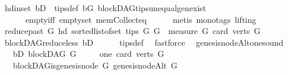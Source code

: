 \begin{isabellebody}
\ hd{\isacharunderscore}{\kern0pt}in{\isacharunderscore}{\kern0pt}set\ bD\ \ tips{\isacharunderscore}{\kern0pt}def\ bG\ blockDAG{\isachardot}{\kern0pt}tips{\isacharunderscore}{\kern0pt}unequal{\isacharunderscore}{\kern0pt}gen{\isacharunderscore}{\kern0pt}exist\ \isanewline
\ \ \ \ \ \ empty{\isacharunderscore}{\kern0pt}iff\ empty{\isacharunderscore}{\kern0pt}set\ mem{\isacharunderscore}{\kern0pt}Collect{\isacharunderscore}{\kern0pt}eq\isanewline
\ \ \ \ \isamarkupfalse%
\ {\isacharparenleft}{\kern0pt}metis\ {\isacharparenleft}{\kern0pt}mono{\isacharunderscore}{\kern0pt}tags{\isacharcomma}{\kern0pt}\ lifting{\isacharparenright}{\kern0pt}{\isacharparenright}{\kern0pt}\ \ \isanewline
\ \ \isamarkupfalse%
\ \isamarkupfalse%
\ {\isachardoublequoteopen}{\isacharparenleft}{\kern0pt}reduce{\isacharunderscore}{\kern0pt}past\ G\ {\isacharparenleft}{\kern0pt}hd\ {\isacharparenleft}{\kern0pt}sorted{\isacharunderscore}{\kern0pt}list{\isacharunderscore}{\kern0pt}of{\isacharunderscore}{\kern0pt}set\ {\isacharparenleft}{\kern0pt}tips\ G{\isacharparenright}{\kern0pt}{\isacharparenright}{\kern0pt}{\isacharparenright}{\kern0pt}{\isacharcomma}{\kern0pt}\ G{\isacharparenright}{\kern0pt}\ {\isasymin}\ measure\ {\isacharparenleft}{\kern0pt}{\isasymlambda}G{\isachardot}{\kern0pt}\ card\ {\isacharparenleft}{\kern0pt}verts\ G{\isacharparenright}{\kern0pt}{\isacharparenright}{\kern0pt}{\isachardoublequoteclose}\isanewline
\ \ \ \ \isamarkupfalse%
\ blockDAG{\isachardot}{\kern0pt}reduce{\isacharunderscore}{\kern0pt}less\ bD\isanewline
\ \ \ \ \isamarkupfalse%
\ tips{\isacharunderscore}{\kern0pt}def\ \isamarkupfalse%
\ fastforce\ \isanewline
{}\isamarkupfalse%
%
\endisatagproof
{\isafoldproof}%
%
\isadelimproof
%
\endisadelimproof
\isanewline
\isanewline
{}\isamarkupfalse%
\ genesis{\isacharunderscore}{\kern0pt}nodeAlt{\isacharunderscore}{\kern0pt}one{\isacharunderscore}{\kern0pt}sound{\isacharcolon}{\kern0pt}\isanewline
\ \ \ bD{\isacharcolon}{\kern0pt}\ {\isachardoublequoteopen}blockDAG\ G{\isachardoublequoteclose}\isanewline
\ \ \ \ \ one{\isacharcolon}{\kern0pt}\ {\isachardoublequoteopen}card\ {\isacharparenleft}{\kern0pt}verts\ G{\isacharparenright}{\kern0pt}\ {\isacharequal}{\kern0pt}\ {}{\isachardoublequoteclose}\isanewline
\ \ \ {\isachardoublequoteopen}blockDAG{\isachardot}{\kern0pt}is{\isacharunderscore}{\kern0pt}genesis{\isacharunderscore}{\kern0pt}node\ G\ {\isacharparenleft}{\kern0pt}genesis{\isacharunderscore}{\kern0pt}nodeAlt\ G{\isacharparenright}{\kern0pt}{\isachardoublequoteclose}\ \isanewline

\end{isabellebody}
